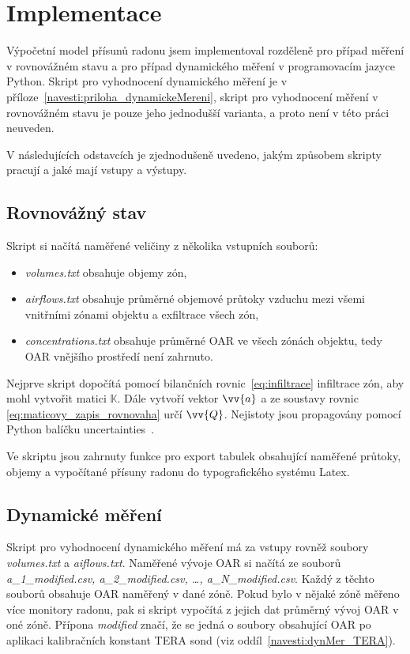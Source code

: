 \section{Implementace}
Výpočetní model přísunů radonu jsem implementoval rozděleně pro případ měření v rovnovážném stavu a pro případ dynamického měření v programovacím jazyce Python. Skript pro vyhodnocení dynamického měření je v příloze~\ref{navesti:priloha_dynamickeMereni}, skript pro vyhodnocení měření v rovnovážném stavu je pouze jeho jednodušší varianta, a proto není v této práci neuveden.

V následujících odstavcích je zjednodušeně uvedeno, jakým způsobem skripty pracují a jaké mají vstupy a výstupy.
\subsection{Rovnovážný stav}
Skript si načítá naměřené veličiny z několika vstupních souborů:
\begin{itemize}
    \item\emph{volumes.txt} obsahuje objemy zón,
    \item\emph{airflows.txt} obsahuje průměrné objemové průtoky vzduchu mezi všemi  vnitřními zónami objektu a exfiltrace všech zón,
    \item\emph{concentrations.txt} obsahuje průměrné OAR ve všech zónách objektu, tedy OAR vnějšího prostředí není zahrnuto.
\end{itemize}

Nejprve skript dopočítá pomocí bilančních rovnic~\eqref{eq:infiltrace} infiltrace zón, aby mohl vytvořit matici $\mathbb{K}$. Dále vytvoří vektor $\vv{a}$ a ze soustavy rovnic \eqref{eq:maticovy_zapis_rovnovaha} určí $\vv{Q}$. Nejistoty jsou propagovány pomocí Python balíčku uncertainties~\cite{uncertainties}.

Ve skriptu jsou zahrnuty funkce pro export tabulek obsahující naměřené průtoky, objemy a vypočítané přísuny radonu do typografického systému Latex.

\subsection{Dynamické měření}
Skript pro vyhodnocení dynamického měření má za vstupy rovněž soubory \emph{volumes.txt} a \emph{aiflows.txt}. Naměřené vývoje OAR si načítá ze souborů \emph{a\_1\_modified.csv, a\_2\_modified.csv, \ldots, a\_N\_modified.csv}. Každý z těchto souborů obsahuje OAR naměřený v dané zóně. Pokud bylo v nějaké zóně měřeno více monitory radonu, pak si skript vypočítá z jejich dat průměrný vývoj OAR v oné zóně. Přípona \emph{modified} značí, že se jedná o soubory obsahující OAR po aplikaci kalibračních konstant TERA sond (viz oddíl~\ref{navesti:dynMer_TERA}).

